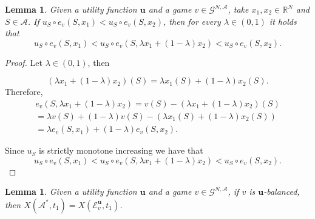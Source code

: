 \documentclass[a4paper,12pt]{article}
\newtheorem{lemma}[theorem]{Lemma}
\theoremstyle{definition}
\theoremstyle{remark}
\begin{document}
\begin{lemma}\label{lemma:monotone}
Given a utility function $\mathbf{u}$ and a game $v\in \mathcal{G}^{N, \mathcal{A}}$, take $x_1, x_2 \in \mathbb{R}^N$ and $S\in \mathcal{A}$. If $u_S\circ e_v(S, x_1) < u_S\circ e_v(S, x_2)$,  then for every $\lambda \in (0, 1)$ it holds that 
\begin{equation*}
u_S\circ e_v(S, x_1) < u_S\circ e_v(S, \lambda x_1 + (1-\lambda) x_2) < u_S\circ e_v(S, x_2).
\end{equation*}
\end{lemma}

\begin{proof}
Let $\lambda \in (0, 1)$, then 

\begin{equation*}
(\lambda x_1 + (1- \lambda) x_2)(S) = \lambda x_1(S) + (1- \lambda)x_2(S).
\end{equation*}
Therefore, 
\begin{equation*}
\begin{split}
e_v(S, \lambda x_1 + (1- \lambda) x_2) = v(S)-(\lambda x_1 + (1- \lambda) x_2)(S) \\
= \lambda v(S) + (1- \lambda) v(S) - (\lambda x_1(S) + (1- \lambda)x_2(S)) \\
= \lambda e_v(S, x_1) + (1- \lambda)e_v(S, x_2).
\end{split}
\end{equation*}

Since $u_S$ is strictly monotone increasing we have that
\begin{equation*}
u_S\circ e_v(S, x_1) < u_S\circ e_v(S, \lambda x_1 + (1-\lambda) x_2) < u_S\circ e_v(S, x_2).
\end{equation*}
\end{proof}

\begin{lemma}\label{lemma:X1=X1'}
Given a utility function $\mathbf{u}$ and a  game $v\in \mathcal{G}^{N, \mathcal{A}}$, if $v$ is $\mathbf{u}$-balanced, then $X(\mathcal{A}^\ast, t_1) = X(\mathcal{E}_v^{\mathbf{u}}, t_1)$.
\end{lemma}
\end{document}
